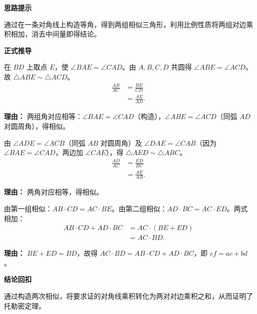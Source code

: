 \begin{proofbox}
	\textbf{\textcolor{CProof}{思路提示}}

	通过在一条对角线上构造等角，得到两组相似三角形，利用比例性质将两组对边乘积相加，消去中间量即得结论。

	\medskip
	\textbf{\textcolor{CProof}{正式推导}}
	\begin{description}[style=nextline, leftmargin=2.8em, labelsep=0.5em, itemsep=0.55em]
		\item[\textbf{步骤一（构造相似一）：}] 在 $BD$ 上取点 $E$，使 $\angle BAE = \angle CAD$。由 $A,B,C,D$ 共圆得 $\angle ABE = \angle ACD$。故 $\triangle ABE \sim \triangle ACD$。
			\[
				\begin{aligned}
					\frac{AB}{AC} &= \frac{BE}{CD} \\
					&= \frac{AE}{AD}.
			\end{aligned}
			\]
			\par\textbf{理由：} 两组角对应相等：$\angle BAE = \angle CAD$（构造），$\angle ABE = \angle ACD$（同弧 $AD$ 对圆周角），得相似。

		\item[\textbf{步骤二（构造相似二）：}] 由 $\angle ADE = \angle ACB$（同弧 $AB$ 对圆周角）及 $\angle DAE = \angle CAB$（因为 $\angle BAE = \angle CAD$，两边加 $\angle CAE$），得 $\triangle AED \sim \triangle ABC$。
			\[
				\begin{aligned}
					\frac{AD}{AC} &= \frac{ED}{BC} \\
					&= \frac{AE}{AB}.
			\end{aligned}
			\]
			\par\textbf{理由：} 两角对应相等，得相似。

		\item[\textbf{步骤三（相乘相加）：}] 由第一组相似：$AB\cdot CD = AC\cdot BE$。由第二组相似：$AD\cdot BC = AC\cdot ED$。两式相加：
			\[
				\begin{aligned}
					AB\cdot CD + AD\cdot BC &= AC\cdot (BE+ED) \\
					&= AC\cdot BD.
			\end{aligned}
			\]
			\par\textbf{理由：} $BE+ED=BD$，故得 $AC\cdot BD = AB\cdot CD + AD\cdot BC$，即 $ef=ac+bd$。
	\end{description}

	\medskip
	\textbf{\textcolor{CProof}{结论回扣}}

	通过构造两次相似，将要求证的对角线乘积转化为两对对边乘积之和，从而证明了托勒密定理。
\end{proofbox}
